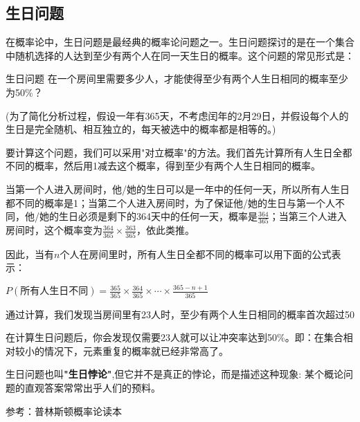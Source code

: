 
\subsection{生日问题}

在概率论中，生日问题是最经典的概率论问题之一。生日问题探讨的是在一个集合中随机选择的人达到至少有两个人在同一天生日的概率。这个问题的常见形式是：

\begin{example}{生日问题}
在一个房间里需要多少人，才能使得至少有两个人生日相同的概率至少为50\%？

(为了简化分析过程，假设一年有365天，不考虑闰年的2月29日，并假设每个人的生日是完全随机、相互独立的，每天被选中的概率都是相等的。)
\end{example}

要计算这个问题，我们可以采用"对立概率"的方法。我们首先计算所有人生日全都不同的概率，然后用1减去这个概率，得到至少有两个人生日相同的概率。

当第一个人进入房间时，他/她的生日可以是一年中的任何一天，所以所有人生日都不同的概率是1；当第二个人进入房间时，为了保证他/她的生日与第一个人不同，他/她的生日必须是剩下的364天中的任何一天，概率是$\frac{364}{365}$；当第三个人进入房间时，这个概率变为$\frac{364}{365} \times \frac{363}{365}$，依此类推。

因此，当有$n$个人在房间里时，所有人生日全都不同的概率可以用下面的公式表示：

$
P(\text{所有人生日不同}) = \frac{365}{365} \times \frac{364}{365} \times \cdots \times \frac{365-n+1}{365}
$


\textbf{}

通过计算，我们发现当房间里有23人时，至少有两个人生日相同的概率首次超过50%

在计算生日问题后，你会发现仅需要23人就可以让冲突率达到50\%。即：在集合相对较小的情况下，元素重复的概率就已经非常高了。

生日问题也叫\textbf{"生日悖论"},但它并不是真正的悖论，而是描述这种现象: 某个概论问题的直观答案常常出乎人们的预料。



参考：普林斯顿概率论读本